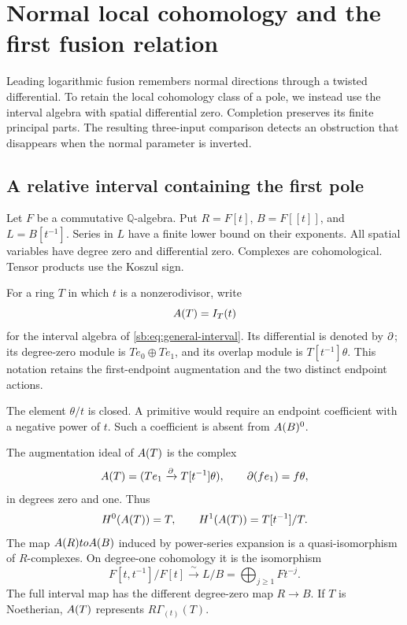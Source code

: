 \section{Normal local cohomology and the first fusion relation}
\label{sec:normal-locality}

Leading logarithmic fusion remembers normal directions through a
twisted differential.  To retain the local cohomology class of a pole,
we instead use the interval algebra with spatial differential zero.
Completion preserves its finite principal parts.  The resulting
three-input comparison detects an obstruction that disappears when
the normal parameter is inverted.

\subsection{A relative interval containing the first pole}

Let \(F\) be a commutative \(\mathbb Q\)-algebra. Put
\(R=F[t]\), \(B=F[[t]]\), and \(L=B[t^{-1}]\).
Series in \(L\) have a finite lower bound on their exponents.
All spatial variables have degree zero and differential zero.
Complexes are cohomological. Tensor products use the Koszul sign.

For a ring \(T\) in which \(t\) is a nonzerodivisor, write
\begin{equation}\label{nl:eq:interval}
 A(T)=I_T(t)
\end{equation}
for the interval algebra of \eqref{sb:eq:general-interval}.
Its differential is denoted by \(\partial\); its degree-zero module
is \(Te_0\oplus Te_1\), and its overlap module is
\(T[t^{-1}]\theta\).  This notation retains the first-endpoint
augmentation and the two distinct endpoint actions.

The element \(\theta/t\) is closed. A primitive would require
an endpoint coefficient with a negative power of \(t\).
Such a coefficient is absent from \(A(B)^0\).

\begin{theorem}\label{nl:thm:relative}
The augmentation ideal of \(A(T)\) is the complex
\[
 A(T)=(Te_1\xrightarrow{\partial}T[t^{-1}]\theta),
 \qquad \partial(fe_1)=f\theta,
\]
in degrees zero and one. Thus
\[
 H^0(A(T))=T,\qquad
 H^1(A(T))=T[t^{-1}]/T.
\]
The map \(A(R)toA(B)\) induced by
power-series expansion is a quasi-isomorphism of \(R\)-complexes.
On degree-one cohomology it is the isomorphism
\begin{equation}\label{nl:eq:principal-parts}
 F[t,t^{-1}]/F[t]\xrightarrow{\ \sim\ }L/B
      =\bigoplus_{j\geq1}Ft^{-j}.
\end{equation}
The full interval map has the different degree-zero map \(R\to B\).
If \(T\) is Noetherian, \(A(T)\) represents
\(R\Gamma_{(t)}(T)\).
\end{theorem}

